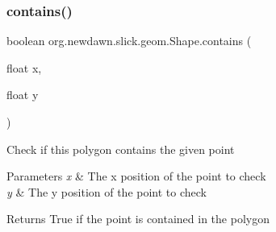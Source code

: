 \subsubsection{\texorpdfstring{contains()}{contains()}\hspace{0.1cm}{\footnotesize\ttfamily [2/2]}}
{\footnotesize\ttfamily boolean org.\+newdawn.\+slick.\+geom.\+Shape.\+contains (\begin{DoxyParamCaption}\item[{float}]{x,  }\item[{float}]{y }\end{DoxyParamCaption})\hspace{0.3cm}{\ttfamily [inline]}}

Check if this polygon contains the given point


\begin{DoxyParams}{Parameters}
{\em x} & The x position of the point to check \\
\hline
{\em y} & The y position of the point to check \\
\hline
\end{DoxyParams}
\begin{DoxyReturn}{Returns}
True if the point is contained in the polygon 
\end{DoxyReturn}

